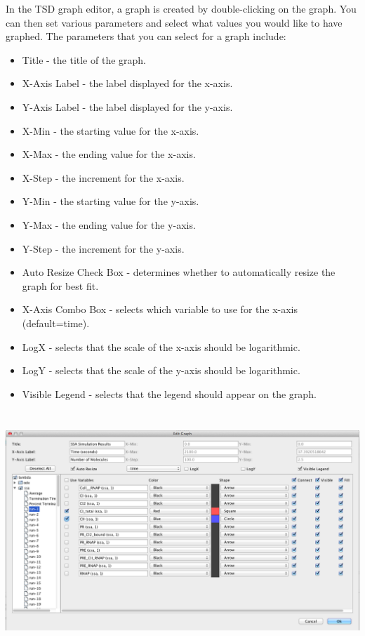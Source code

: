 \documentclass[titlepage,11pt]{article}
\begin{document}
In the TSD graph editor, a graph is created by double-clicking on the graph. You can then set various parameters and select what values you would like to have graphed. The parameters that you can select for a graph include: 
\begin{itemize}
\item Title - the title of the graph.
\item X-Axis Label - the label displayed for the x-axis. 
\item Y-Axis Label - the label displayed for the y-axis. 
\item X-Min - the starting value for the x-axis. 
\item X-Max - the ending value for the x-axis. 
\item X-Step - the increment for the x-axis. 
\item Y-Min - the starting value for the y-axis. 
\item Y-Max - the ending value for the y-axis. 
\item Y-Step - the increment for the y-axis. 
\item Auto Resize Check Box - determines whether to automatically resize the graph for best fit. 
\item X-Axis Combo Box - selects which variable to use for the x-axis (default=time).
\item LogX - selects that the scale of the x-axis should be logarithmic.
\item LogY - selects that the scale of the y-axis should be logarithmic.
\item Visible Legend - selects that the legend should appear on the graph.
\end{itemize}

\begin{center}
\includegraphics[height=90mm]{screenshots/ssaResults}
\end{center}
\end{document}
